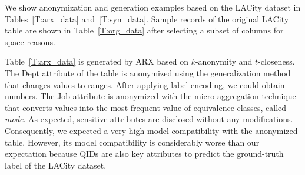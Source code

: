 \begin{table}[t]

\end{table}

We show anonymization and generation examples based on the LACity dataset in Tables~\ref{T:arx_data} and~\ref{T:syn_data}. Sample records of the original LACity table are shown in Table~\ref{T:org_data} after selecting a subset of columns for space reasons.

Table~\ref{T:arx_data} is generated by ARX based on $k$-anonymity and $t$-closeness. The Dept attribute of the table is anonymized using the generalization method that changes values to ranges. After applying label encoding, we could obtain numbers. The Job attribute is anonymized with the micro-aggregation technique that converts values into the most frequent value of equivalence classes, called \textit{mode}. As expected, sensitive attributes are disclosed without any modifications. Consequently, we expected a very high model compatibility with the anonymized table. However, its model compatibility is considerably worse than our expectation because QIDs are also key attributes to predict the ground-truth label of the LACity dataset.

